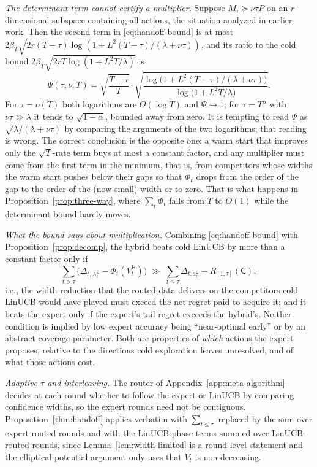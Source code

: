\documentclass{article}
\theoremstyle{definition}
\theoremstyle{remark}
\theoremstyle{remark}
\newcommand{\Cold}{\mathsf{C}}
\newcommand{\Exp}{\mathsf{E}}
\newcommand{\Hyb}{\mathsf{H}}
\begin{document}
\emph{The determinant term cannot certify a multiplier.} Suppose
$M_\tau\succeq\nu\tau P$ on an $r$-dimensional subspace containing all actions,
the situation analyzed in earlier work. Then the second term in
\eqref{eq:handoff-bound} is at most
$2\beta_T\sqrt{2r(T-\tau)\log(1+L^2(T-\tau)/(\lambda+\nu\tau))}$, and its ratio
to the cold bound $2\beta_T\sqrt{2rT\log(1+L^2T/\lambda)}$ is
\[
\Psi(\tau,\nu,T)=\sqrt{\frac{T-\tau}{T}}\cdot\sqrt{\frac{\log\bigl(1+L^2(T-\tau)/(\lambda+\nu\tau)\bigr)}{\log\bigl(1+L^2T/\lambda\bigr)}}.
\]
For $\tau=o(T)$ both logarithms are $\Theta(\log T)$ and $\Psi\to1$; for
$\tau=T^{\alpha}$ with $\nu\tau\gg\lambda$ it tends to $\sqrt{1-\alpha}$, bounded
away from zero. It is tempting to read $\Psi$ as
$\sqrt{\lambda/(\lambda+\nu\tau)}$ by comparing the arguments of the two
logarithms; that reading is wrong. The correct conclusion is the opposite
one: a warm start that improves only the $\sqrt{T}$-rate term buys at most a
constant factor, and any multiplier must come from the first term in the
minimum, that is, from competitors whose widths the warm start pushes below
their gaps so that $\Phi_t$ drops from the order of the gap to the order of
the (now small) width or to zero. That is what happens in
Proposition~\ref{prop:three-way}, where $\sum_t\Phi_t$ falls from $T$ to $O(1)$
while the determinant bound barely moves.

\emph{What the bound says about multiplication.} Combining
\eqref{eq:handoff-bound} with Proposition~\ref{prop:decomp}, the hybrid beats
cold LinUCB by more than a constant factor only if
\[
\sum_{t>\tau}\bigl(\Delta_{t,A^{\Cold}_t}-\Phi_t(V^{\Hyb}_t)\bigr)
\;\gg\;
\sum_{t\le\tau}\Delta_{t,a_t^{\Exp}}-R_{[1,\tau]}(\Cold),
\]
i.e., the width reduction that the routed data delivers on the competitors
cold LinUCB would have played must exceed the net regret paid to acquire it;
and it beats the expert only if the expert's tail regret exceeds the hybrid's.
Neither condition is implied by low expert accuracy being ``near-optimal
early'' or by an abstract coverage parameter. Both are properties of
\emph{which} actions the expert proposes, relative to the directions cold
exploration leaves unresolved, and of what those actions cost.

\emph{Adaptive $\tau$ and interleaving.} The router of
Appendix~\ref{app:meta-algorithm} decides at each round whether to follow the
expert or LinUCB by comparing confidence widths, so the expert rounds need not
be contiguous. Proposition~\ref{thm:handoff} applies verbatim with
$\sum_{t\le\tau}$ replaced by the sum over expert-routed rounds and with the
LinUCB-phase terms summed over LinUCB-routed rounds, since
Lemma~\ref{lem:width-limited} is a round-level statement and the elliptical
potential argument only uses that $V_t$ is non-decreasing.
\end{document}
